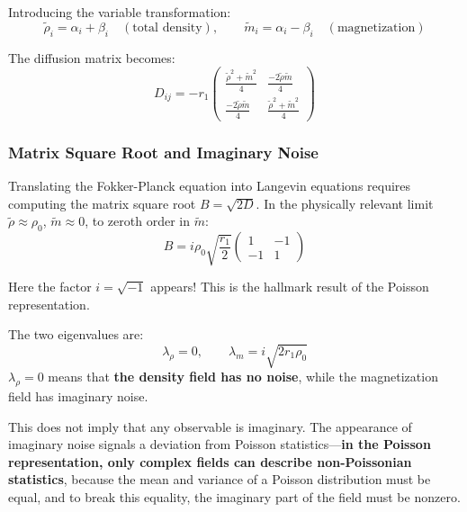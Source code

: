 Introducing the variable transformation:
\begin{equation}\label{eq:variable-change}
\tilde{\rho}_i = \alpha_i + \beta_i \quad (\text{total density}), \qquad \tilde{m}_i = \alpha_i - \beta_i \quad (\text{magnetization})
\end{equation}

The diffusion matrix becomes:
\begin{equation}\label{eq:diffusion-rho-m}
D_{ij} = -r_1 \begin{pmatrix} \frac{\tilde{\rho}^2 + \tilde{m}^2}{4} & \frac{-2\tilde{\rho}\tilde{m}}{4} \\ \frac{-2\tilde{\rho}\tilde{m}}{4} & \frac{\tilde{\rho}^2 + \tilde{m}^2}{4} \end{pmatrix}
\end{equation}

\subsubsection{Matrix Square Root and Imaginary Noise}

Translating the Fokker-Planck equation into Langevin equations requires computing the matrix square root $B = \sqrt{2D}$. In the physically relevant limit $\tilde{\rho} \approx \rho_0$, $\tilde{m} \approx 0$, to zeroth order in $\tilde{m}$:
\begin{equation}\label{eq:matrix-sqrt}
B = i\rho_0\sqrt{\frac{r_1}{2}} \begin{pmatrix} 1 & -1 \\ -1 & 1 \end{pmatrix}
\end{equation}

Here the factor $i = \sqrt{-1}$ appears! This is the hallmark result of the Poisson representation.

\begin{notebox}
The two eigenvalues are:
\[
\lambda_\rho = 0, \qquad \lambda_m = i\sqrt{2r_1\rho_0}
\]
$\lambda_\rho = 0$ means that \textbf{the density field has no noise}, while the magnetization field has imaginary noise.

This does not imply that any observable is imaginary. The appearance of imaginary noise signals a deviation from Poisson statistics---\textbf{in the Poisson representation, only complex fields can describe non-Poissonian statistics}, because the mean and variance of a Poisson distribution must be equal, and to break this equality, the imaginary part of the field must be nonzero.
\end{notebox}

